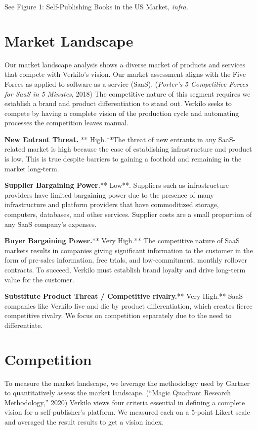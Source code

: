 \documentclass[10pt,openany]{book}
\begin{document}
See Figure 1: Self-Publishing Books in the US Market, \emph{infra.}

\hypertarget{market-landscape}{%
\section{Market Landscape}\label{market-landscape}}

Our market landscape analysis shows a diverse market of products and
services that compete with Verkilo's vision. Our market assessment
aligns with the Five Forces as applied to software as a service (SaaS).
(\emph{Porter's 5 Competitive Forces for SaaS in 5 Minutes}, 2018) The
competitive nature of this segment requires we establish a brand and
product differentiation to stand out. Verkilo seeks to compete by having
a complete vision of the production cycle and automating processes the
competition leaves manual.

\textbf{New Entrant Threat.} ** High.**The threat of new entrants in any
SaaS-related market is high because the ease of establishing
infrastructure and product is low. This is true despite barriers to
gaining a foothold and remaining in the market long-term.

\textbf{Supplier Bargaining Power.}** Low**. Suppliers such as
infrastructure providers have limited bargaining power due to the
presence of many infrastructure and platform providers that have
commoditized storage, computers, databases, and other services. Supplier
costs are a small proportion of any SaaS company's expenses.

\textbf{Buyer Bargaining Power.}** Very High.** The competitive nature
of SaaS markets results in companies giving significant information to
the customer in the form of pre-sales information, free trials, and
low-commitment, monthly rollover contracts. To succeed, Verkilo must
establish brand loyalty and drive long-term value for the customer.

\textbf{Substitute Product Threat / Competitive rivalry.}** Very High.**
SaaS companies like Verkilo live and die by product differentiation,
which creates fierce competitive rivalry. We focus on competition
separately due to the need to differentiate.

\hypertarget{competition}{%
\section{Competition}\label{competition}}

To measure the market landscape, we leverage the methodology used by
Gartner to quantitatively assess the market landscape. (``Magic Quadrant
Research Methodology,'' 2020) Verkilo views four criteria essential in
defining a complete vision for a self-publisher's platform. We measured
each on a 5-point Likert scale and averaged the result results to get a
vision index.
\end{document}
